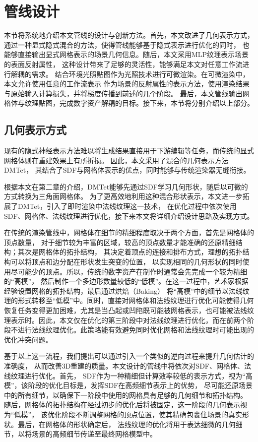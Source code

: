 \section{管线设计}
本节将系统地介绍本文管线的设计与创新方法。首先，本文改进了几何表示方式，
通过一种显式隐式混合的方法，使得管线能够基于隐式表示进行优化的同时，
也能够直接输出显式网格表示的场景几何信息。随后，本文采用MLP纹理表示场景的表面反射属性，
这种设计带来了足够的灵活性，能够满足本文对任意工作流进行解耦的需求。
结合环境光照贴图作为光照技术进行可微渲染。在可微渲染中，本文允许使用任意的工作流表示
作为场景的反射属性的表示方法，使用渲染结果与原始输入计算损失，并将梯度传播到前述的几个阶段。
最后，本文管线输出网格体与纹理贴图，完成数字资产解耦的目标。接下来，本节将分别介绍以上部分。

\subsection{几何表示方式}

现有的隐式神经表示方法难以将生成结果直接用于下游编辑等任务，而传统的显式网格体则在重建效果上有所折损。
因此，本文采用了混合的几何表示方法DMTet\cite{shen2021deep}，
其结合了SDF与网格体表示的优点，同时能够与传统渲染器无缝衔接。

根据本文在第二章的介绍，DMTet能够先通过SDF学习几何形状，随后以可微的方式转换为三角面网格体。
为了更高效地利用这种混合形状表示，本文进一步拓展了DMTet，引入了即时渲染中法线纹理这一技术，
在优化过程中依次使用SDF、网格体、法线纹理进行优化，接下来本文将详细介绍设计思路及实现方式。

在传统的渲染管线中，网格体在细节的精细程度取决于两个方面，首先是网格体的顶点数量，
对于细节较为丰富的区域，较高的顶点数量才能准确的还原精细结构；其次是网格体的拓扑结构，
其决定着顶点的连接和排布方式，理想的拓扑结构可以将顶点和边分配在形状发生突变的位置，
以实现相同的几何形状的同时使用尽可能少的顶点。所以，传统的数字资产在制作时通常会先完成一个较为精细的“高模”，
然后制作一个多边形数量较低的“低模”。在这一过程中，艺术家根据经验设置网格的拓扑结构，最后通过烘焙（Baking）
将“高模”中的细节以法线纹理的形式转移至“低模”中。同时，直接对网格体和法线纹理进行优化可能使得几何恢复任务变得更加困难，尤其是当凸起或凹陷既可能被网格表示，也可能被法线纹理表示时。因此，本文仅在优化的第三阶段中对法线纹理进行优化，而在前两个阶段不进行法线纹理优化。此策略能有效避免同时优化网格和法线纹理时可能出现的优化冲突问题。

基于以上这一流程，我们提出可以通过引入一个类似的逆向过程来提升几何估计的准确度，
从而改善3D重建的质量。本文设计的管线中将依次对SDF、网格体、法线纹理进行优化。首先，
SDF作为一种精细但计算效率较低的表示方式，视为“高模”，该阶段的优化目标是，发挥SDF在高频细节表示上的优势，
尽可能还原场景中的所有细节，以确保下一阶段中使用的网格具有足够的几何细节和拓扑结构。
随后，网格体的拓扑结构在经过初步的优化后将被固定，这一阶段的几何表示视为“低模”，
该优化阶段不断调整网格的顶点位置，使其精确包裹住场景的真实形状。最后，在网格体的形状确定后，
法线纹理的优化将用于表达细微的几何细节，以将场景的高频细节传递至最终网格模型中。

